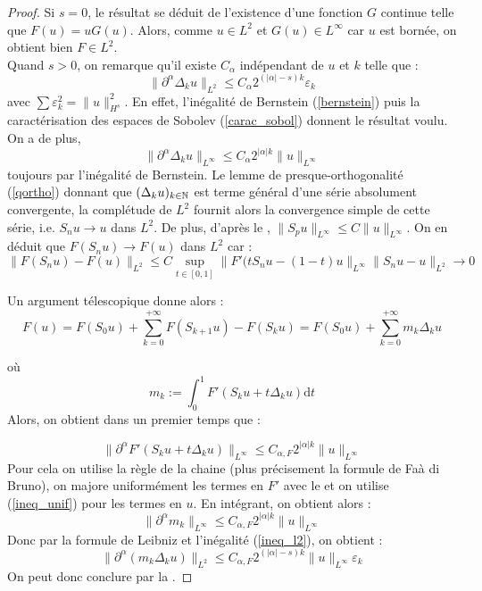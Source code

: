 \documentclass[11pt,a4paper]{article}
\begin{document}
\begin{proof}
Si $s=0$, le résultat se déduit de l'existence d'une fonction $G$ continue telle que $F(u)=uG(u)$. Alors, comme $u\in L^2$ et $G(u) \in L^{\infty}$ car $u$ est bornée, on obtient bien $F\in L^2$. \\
Quand $s>0$, on remarque qu'il existe $C_\alpha$  indépendant de $u$ et $k$ telle que  : 
\begin{equation}\label{ineq_l2}
\|\partial^\alpha \Delta_k u \|_{L^2} \leq C_\alpha 2^{(|\alpha|-s)k} \varepsilon_k
\end{equation}
avec $\sum \varepsilon_k^2 =  \|u\|_{H^s}^2$. En effet, l'inégalité de Bernstein (\ref{bernstein}) puis la caractérisation des espaces de Sobolev (\ref{carac_sobol}) donnent le résultat voulu. On a de plus,
\begin{equation}\label{ineq_unif}
\|\partial^\alpha \Delta_k u \|_{L^{\infty}} \leq C_\alpha 2^{|\alpha|k} \|u\|_{L^{\infty}}
\end{equation}
toujours par l'inégalité de Bernstein. Le lemme de presque-orthogonalité (\ref{qortho}) donnant que $(\Delta_k u)_{k\in \mathbb N}$ est terme général d'une série absolument convergente, la complétude de $L^2$ fournit alors la convergence simple de cette série, i.e. $S_nu \to u$ dans $L^2$. De plus, d'après le ,  $\|S_pu\|_{L^\infty} \leq C \|u\|_{L^\infty}$. On en déduit que $F(S_nu) \to F(u)$ dans $L^2$ car :
\[ \| F(S_nu) - F(u)\|_{L^2} \leq C \sup_{t\in[0,1]} \|F'(tS_nu- (1-t)u \|_{L^\infty}\|S_nu-u\|_{L^2} \to 0 \]

Un argument télescopique donne alors : 
\begin{equation}\label{telesc}
F(u) = F(S_0 u) + \sum_{k=0}^{+\infty} F(S_{k+1} u) - F(S_k u) = F(S_0 u) + \sum_{k=0}^{+\infty} m_k \Delta_k u
\end{equation}

où \[m_k := \int_0^1 F'(S_ku + t\Delta_ku)\mathrm{d}t\]
Alors, on obtient dans un premier temps que : 

\begin{equation*}
\| \partial^\alpha F'(S_ku + t\Delta_ku)\|_{L^{\infty}} \leq C_{\alpha,F} 2^{|\alpha|k} \|u\|_{L^{\infty}}
\end{equation*}
Pour cela on utilise la règle de la chaine (plus précisement la formule de Faà di Bruno), on majore uniformément les termes en $F'$ avec le  et on utilise (\ref{ineq_unif}) pour les termes en $u$.
En intégrant, on obtient alors :
\begin{equation}\label{majint}
\|\partial^\alpha m_k \|_{L^\infty} \leq C_{\alpha,F} 2^{|\alpha|k} \|u\|_{L^{\infty}}
\end{equation}
Donc par la formule de Leibniz et l'inégalité (\ref{ineq_l2}), on obtient :
\begin{equation*}
\|\partial^\alpha(m_k \Delta_k u) \|_{L^2} \leq C_{\alpha,F} 2^{(|\alpha|-s)k} \|u\|_{L^{\infty}} \varepsilon_k
\end{equation*}
On peut donc conclure par la .
\end{proof}
\end{document}
